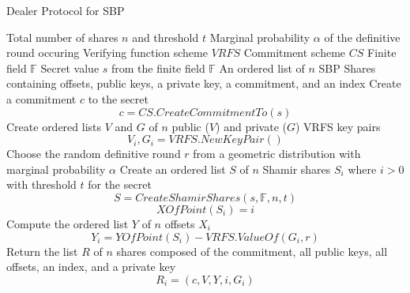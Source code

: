 \documentclass{dalcsthesis}
\begin{document}
\begin{algorithm}
  \caption{Dealer Protocol for SBP}
  \label{alg:SBP:Dealer}
  \begin{algorithmic}[1]
    \INPUT Total number of shares $n$ and threshold $t$
    \INPUT Marginal probability $\alpha$ of the definitive round occuring
    \INPUT Verifying function scheme $VRFS$
    \INPUT Commitment scheme $CS$
    \INPUT Finite field $\mathbb{F}$
    \INPUT Secret value $s$ from the finite field $\mathbb{F}$
    \OUTPUT An ordered list of $n$ SBP Shares containing offsets, public keys, a private key, a commitment, and an index
    \STATE Create a commitment $c$ to the secret
    	$$c = CS.CreateCommitmentTo(s)$$
    \STATE Create ordered lists $V$ and $G$ of $n$ public ($V$) and private ($G$) VRFS key pairs
    	$$V_i, G_i = VRFS.NewKeyPair()$$
    \STATE Choose the random definitive round $r$ from a geometric distribution with marginal probability $\alpha$
    \STATE Create an ordered list $S$ of $n$ Shamir shares $S_i$ where $i > 0$ with threshold $t$ for the secret
    	$$S = CreateShamirShares(s, \mathbb{F}, n, t)$$
    	$$XOfPoint(S_i) = i$$
    \STATE Compute the ordered list $Y$ of $n$ offsets $X_i$
    	$$Y_i = YOfPoint(S_i) - VRFS.ValueOf(G_i, r)$$
    \STATE Return the list $R$ of $n$ shares composed of the commitment, all public keys, all offsets, an index, and a private key
    	$$R_i = (c, V, Y, i, G_i)$$
  \end{algorithmic}
\end{algorithm}
\end{document}
